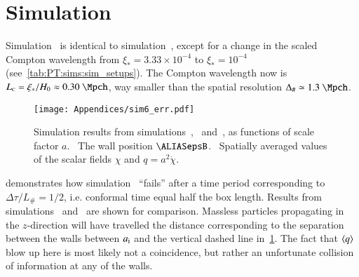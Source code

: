 




\newcommand\Ft{\ALIASFt}
\newcommand\ah{\ALIASah}
\newcommand\lcoord{\ALIASlcoord}
\newcommand\lcoordx{\ALIASlcoordx}
\newcommand\lcoordk{\ALIASlcoordk}
\newcommand\hpA{\ALIAShpA}
\newcommand\hpB{\ALIAShpB}
\newcommand\hpC{\ALIAShpC}
\newcommand\hpAB{\ALIAShpAB}
\newcommand\hpCR{\ALIAShpCR}
\newcommand\hpCI{\ALIAShpCI}
\newcommand\epsA{\ALIASepsA}
\newcommand\epsB{\ALIASepsB}
\newcommand\epsC{\ALIASepsC}






\section{Simulation~}\label{app:misc:sim6}
    Simulation~ is identical to simulation~, except for a change in the scaled Compton wavelength from $\xi_\ast=3.33\times 10^{-4}$ to $\xi_\ast = 10^{-4}$ (see~\cref{tab:PT:sims:sim_setups}). %
    The Compton wavelength now is $L\nped{C} = \xi_\ast/H_0 \approx 0.30~\Mpch$, 
    way smaller than the spatial resolution $\Delta_\# \simeq 1.3~\Mpch$. %
    \begin{figure}[hb]
        \centering
        \texttt{[image: Appendices/sim6\_err.pdf]}
        \caption{Simulation results from simulations~,~ and~, as functions of scale factor $a$. ~The wall position $\epsB$. ~Spatially averaged values of the scalar fields $\chi$ and $q=a^2 \dot{\chi}$.}
        \label{fig:misc:sim6:sim6_err}
    \end{figure}%
     demonstrates how simulation~ ``fails'' after a time period corresponding to $\Delta \tau/L_\#= 1/2$, i.e. conformal time equal half the box length. Results from simulations~ and~ are shown for comparison. %
    Massless particles propagating in the $z$-direction will have travelled the distance corresponding to the separation between the walls between $a_\mathrm{i}$ and the vertical dashed line in~\cref{fig:misc:sim6:sim6_err}. The fact that $\left\langle{q}\right\rangle$ blow up here is most likely not a coincidence, but rather an unfortunate collision of information at any of the walls.  




